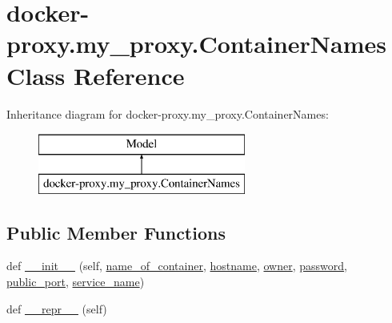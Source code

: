 \hypertarget{classdocker-proxy_1_1my__proxy_1_1_container_names}{}\section{docker-\/proxy.my\+\_\+proxy.\+Container\+Names Class Reference}
\label{classdocker-proxy_1_1my__proxy_1_1_container_names}
Inheritance diagram for docker-\/proxy.my\+\_\+proxy.\+Container\+Names\+:\begin{figure}[H]
\begin{center}
\leavevmode
\includegraphics[height=2.000000cm]{classdocker-proxy_1_1my__proxy_1_1_container_names}
\end{center}
\end{figure}
\subsection*{Public Member Functions}
\begin{DoxyCompactItemize}
\item 
def \hyperlink{classdocker-proxy_1_1my__proxy_1_1_container_names_a6f793b87c5c96d4c3c8becfbc748ada9}{\+\_\+\+\_\+init\+\_\+\+\_\+} (self, \hyperlink{classdocker-proxy_1_1my__proxy_1_1_container_names_a5223d4e116bb162d327af3fbdf406c62}{name\+\_\+of\+\_\+container}, \hyperlink{classdocker-proxy_1_1my__proxy_1_1_container_names_aacca73fd2984a6225ff6f82fb681a508}{hostname}, \hyperlink{classdocker-proxy_1_1my__proxy_1_1_container_names_a18b80021fc434e7dac00f009f7a451b5}{owner}, \hyperlink{classdocker-proxy_1_1my__proxy_1_1_container_names_a5728904cb244540aa3421e07dc14cc84}{password}, \hyperlink{classdocker-proxy_1_1my__proxy_1_1_container_names_accfbd6e258c7ede9ac75360c54086e2a}{public\+\_\+port}, \hyperlink{classdocker-proxy_1_1my__proxy_1_1_container_names_ac067fae0674728a7064586300ef6b107}{service\+\_\+name})
\item 
def \hyperlink{classdocker-proxy_1_1my__proxy_1_1_container_names_a5bade0263a94bbfc7ffba0b4179ae27e}{\+\_\+\+\_\+repr\+\_\+\+\_\+} (self)
\end{DoxyCompactItemize}
